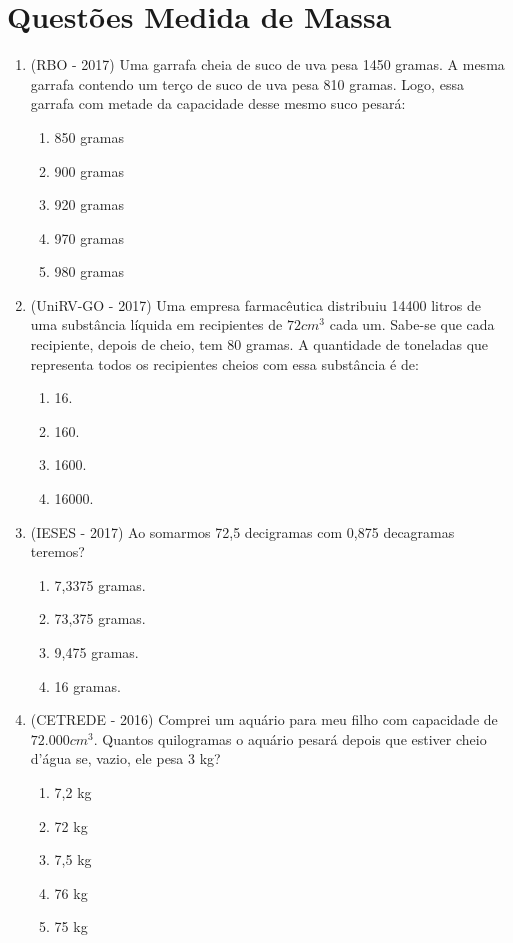 \section{Questões Medida de Massa}
\begin{enumerate}
 \item (RBO - 2017) Uma garrafa cheia de suco de uva pesa 1450 gramas. A mesma garrafa contendo um terço de suco de uva pesa 810 gramas. Logo, essa garrafa com metade da capacidade desse mesmo suco pesará:
 \begin{enumerate}
 \item 850 gramas
 \item 900 gramas
 \item 920 gramas
 \item 970 gramas
 \item 980 gramas
\end{enumerate}


\item (UniRV-GO - 2017) Uma empresa farmacêutica distribuiu 14400 litros de uma substância líquida em recipientes de $72 cm^3$ cada um. Sabe-se que cada recipiente, depois de cheio, tem 80 gramas. A quantidade de toneladas que representa todos os recipientes cheios com essa substância é de:
\begin{enumerate}
 \item 16.
 \item 160.
 \item 1600.
 \item 16000.
\end{enumerate}

\item (IESES - 2017) Ao somarmos 72,5 decigramas com 0,875 decagramas teremos?
\begin{enumerate}
 \item 7,3375 gramas.
 \item 73,375 gramas.
 \item 9,475 gramas.
 \item 16 gramas.
\end{enumerate}

\item (CETREDE - 2016) Comprei um aquário para meu filho com capacidade de $72.000 cm^3$. Quantos quilogramas o aquário pesará depois que estiver cheio d’água se, vazio, ele pesa 3 kg? 
\begin{enumerate}
 \item 7,2 kg
 \item 72 kg
 \item 7,5 kg
 \item 76 kg
 \item 75 kg
\end{enumerate}


\end{enumerate}


